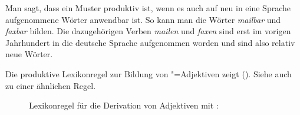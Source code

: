 Man sagt, dass ein Muster produktiv ist, wenn es auch auf neu in eine Sprache
aufgenommene Wörter anwendbar ist. So kann man \zb die Wörter \emph{mailbar} und \emph{faxbar}
bilden. Die dazugehörigen Verben \emph{mailen} und \emph{faxen} sind erst im vorigen Jahrhundert in
die deutsche Sprache aufgenommen worden und sind also relativ neue Wörter.

Die produktive Lexikonregel zur Bildung von "=Adjektiven zeigt (). Siehe auch 
zu einer ähnlichen Regel.
\begin{figure}
\eas
\label{lr-bar-adj}%
Lexikonregel für die Derivation von Adjektiven mit \bars:\\
\zs
\vspace{-\baselineskip}\end{figure}
